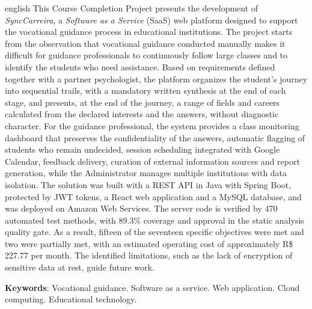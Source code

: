 \begin{resumo}[Abstract]
\begin{otherlanguage*}{english}
This Course Completion Project presents the development of \textit{SyncCarreira}, a \textit{Software as a Service} (SaaS) web platform designed to support the vocational guidance process in educational institutions. The project starts from the observation that vocational guidance conducted manually makes it difficult for guidance professionals to continuously follow large classes and to identify the students who need assistance. Based on requirements defined together with a partner psychologist, the platform organizes the student's journey into sequential trails, with a mandatory written synthesis at the end of each stage, and presents, at the end of the journey, a range of fields and careers calculated from the declared interests and the answers, without diagnostic character. For the guidance professional, the system provides a class monitoring dashboard that preserves the confidentiality of the answers, automatic flagging of students who remain undecided, session scheduling integrated with Google Calendar, feedback delivery, curation of external information sources and report generation, while the Administrator manages multiple institutions with data isolation. The solution was built with a REST API in Java with Spring Boot, protected by JWT tokens, a React web application and a MySQL database, and was deployed on Amazon Web Services. The server code is verified by 470 automated test methods, with 89.3\% coverage and approval in the static analysis quality gate. As a result, fifteen of the seventeen specific objectives were met and two were partially met, with an estimated operating cost of approximately R\$ 227.77 per month. The identified limitations, such as the lack of encryption of sensitive data at rest, guide future work.

\vspace{\onelineskip}

\noindent
\textbf{Keywords}: Vocational guidance. Software as a service. Web application. Cloud computing. Educational technology.
\end{otherlanguage*}
\end{resumo}
